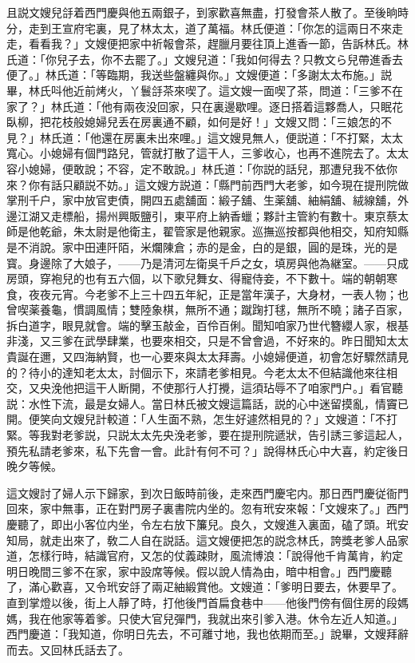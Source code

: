 且説文嫂兒㧱着西門慶與他五兩銀子，到家歡喜無盡，打發會茶人散了。至後晌時分，走到王宣府宅裏，見了林太太，道了萬福。林氏便道：「你怎的這兩日不來走走，看看我？」文嫂便把家中祈報會茶，趕臘月要往頂上進香一節，告訴林氏。林氏道：「你兒子去，你不去罷了。」文嫂兒道：「我如何得去？只教文ら兒帶進香去便了。」林氏道：「等臨期，我送些盤纏與你。」文嫂便道：「多謝太太布施。」説畢，林氏呌他近前烤火，丫鬟㧱茶來喫了。這文嫂一面喫了茶，問道：「三爹不在家了？」林氏道：「他有兩夜没回家，只在裏邊歇哩。逐日搭着這夥喬人，只眠花臥柳，把花枝般媳婦兒丢在房裏通不顧，如何是好！」文嫂又問：「三娘怎的不見？」林氏道：「他還在房裏未出來哩。」這文嫂見無人，便説道：「不打緊，太太寬心。小媳婦有個門路兒，管就打散了這干人，三爹收心，也再不進院去了。太太容小媳婦，便敢說；不容，定不敢說。」林氏道：「你説的話兒，那遭兒我不依你來？你有話只顧説不妨。」這文嫂方説道：「縣門前西門大老爹，如今現在提刑院做掌刑千户，家中放官吏債，開四五處舖面：緞子舖、生薬舖、紬絹舖、絨線舖，外邊江湖又走標船，揚州興販鹽引，東平府上納香蠟；夥計主管約有數十。東京蔡太師是他乾爺，朱太尉是他衛主，翟管家是他親家。巡撫巡按都與他相交，知府知縣是不消說。家中田連阡陌，米爛陳倉；赤的是金，白的是銀，圓的是珠，光的是寳。身邊除了大娘子，——乃是清河左衛吳千戶之女，填房與他為継室。——只成房頭，穿袍兒的也有五六個，以下歌兒舞女、得寵侍妾，不下數十。端的朝朝寒食，夜夜元宵。今老爹不上三十四五年紀，正是當年漢子，大身材，一表人物；也曾喫薬養龜，慣調風情；雙陸象棋，無所不通；蹴踘打毬，無所不曉；諸子百家，拆白道字，眼見就會。端的擊玉敲金，百伶百俐。聞知咱家乃世代簪纓人家，根基非淺，又三爹在武學肆業，也要來相交，只是不曾會過，不好來的。昨日聞知太太貴誕在邇，又四海納賢，也一心要來與太太拜壽。小媳婦便道，初會怎好驟然請見的？待小的達知老太太，討個示下，來請老爹相見。今老太太不但結識他來往相交，又央浼他把這干人断開，不使那行人打攪，這須玷辱不了咱家門户。」看官聽説：水性下流，最是女婦人。當日林氏被文嫂這篇話，説的心中迷留摸亂，情竇已開。便笑向文嫂兒計較道：「人生面不熟，怎生好遽然相見的？」文嫂道：「不打緊。等我對老爹説，只説太太先央浼老爹，要在提刑院遞狀，告引誘三爹這起人，預先私請老爹來，私下先會一會。此計有何不可？」說得林氏心中大喜，約定後日晚夕等候。

這文嫂討了婦人示下歸家，到次日飯時前後，走來西門慶宅内。那日西門慶従衙門回來，家中無事，正在對門房子裏書院内坐的。忽有玳安來報：「文嫂來了。」西門慶聽了，即出小客位内坐，令左右放下簾兒。良久，文嫂進入裏面，磕了頭。玳安知局，就走出來了，敎二人自在説話。這文嫂便把怎的説念林氏，誇獎老爹人品家道，怎樣行時，結識官府，又怎的仗義疎財，風流博浪：「說得他千肯萬肯，約定明日晚間三爹不在家，家中設席等候。假以說人情為由，暗中相會。」西門慶聽了，滿心歡喜，又令玳安㧱了兩疋紬緞賞他。文嫂道：「爹明日要去，休要早了。直到掌燈以後，街上人靜了時，打他後門首扁食巷中——他後門傍有個住房的段媽媽，我在他家等着爹。只使大官兒彈門，我就出來引爹入港。休令左近人知道。」西門慶道：「我知道，你明日先去，不可離寸地，我也依期而至。」說畢，文嫂拜辭而去。又回林氏話去了。

